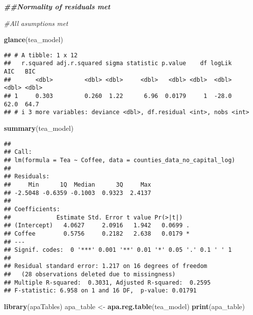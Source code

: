 \documentclass[
]{article}
\newenvironment{Shaded}{\begin{snugshade}}{\end{snugshade}}
\newcommand{\CommentTok}[1]{\textcolor[rgb]{0.56,0.35,0.01}{\textit{#1}}}
\newcommand{\DocumentationTok}[1]{\textcolor[rgb]{0.56,0.35,0.01}{\textbf{\textit{#1}}}}
\newcommand{\FunctionTok}[1]{\textcolor[rgb]{0.13,0.29,0.53}{\textbf{#1}}}
\newcommand{\NormalTok}[1]{#1}
\newcommand{\OtherTok}[1]{\textcolor[rgb]{0.56,0.35,0.01}{#1}}
\begin{document}
\begin{Shaded}
\begin{Highlighting}[]
\DocumentationTok{\#\#Normality of residuals met}

\CommentTok{\#All asumptions met}

\FunctionTok{glance}\NormalTok{(tea\_model)}
\end{Highlighting}
\end{Shaded}

\begin{verbatim}
## # A tibble: 1 x 12
##   r.squared adj.r.squared sigma statistic p.value    df logLik   AIC   BIC
##       <dbl>         <dbl> <dbl>     <dbl>   <dbl> <dbl>  <dbl> <dbl> <dbl>
## 1     0.303         0.260  1.22      6.96  0.0179     1  -28.0  62.0  64.7
## # i 3 more variables: deviance <dbl>, df.residual <int>, nobs <int>
\end{verbatim}

\begin{Shaded}
\begin{Highlighting}[]
\FunctionTok{summary}\NormalTok{(tea\_model)}
\end{Highlighting}
\end{Shaded}

\begin{verbatim}
## 
## Call:
## lm(formula = Tea ~ Coffee, data = counties_data_no_capital_log)
## 
## Residuals:
##     Min      1Q  Median      3Q     Max 
## -2.5048 -0.6359 -0.1003  0.9323  2.4137 
## 
## Coefficients:
##             Estimate Std. Error t value Pr(>|t|)  
## (Intercept)   4.0627     2.0916   1.942   0.0699 .
## Coffee        0.5756     0.2182   2.638   0.0179 *
## ---
## Signif. codes:  0 '***' 0.001 '**' 0.01 '*' 0.05 '.' 0.1 ' ' 1
## 
## Residual standard error: 1.217 on 16 degrees of freedom
##   (28 observations deleted due to missingness)
## Multiple R-squared:  0.3031, Adjusted R-squared:  0.2595 
## F-statistic: 6.958 on 1 and 16 DF,  p-value: 0.01791
\end{verbatim}

\begin{Shaded}
\begin{Highlighting}[]
\FunctionTok{library}\NormalTok{(apaTables)}
\NormalTok{apa\_table }\OtherTok{\textless{}{-}} \FunctionTok{apa.reg.table}\NormalTok{(tea\_model)}
\FunctionTok{print}\NormalTok{(apa\_table)}
\end{Highlighting}
\end{Shaded}
\end{document}
